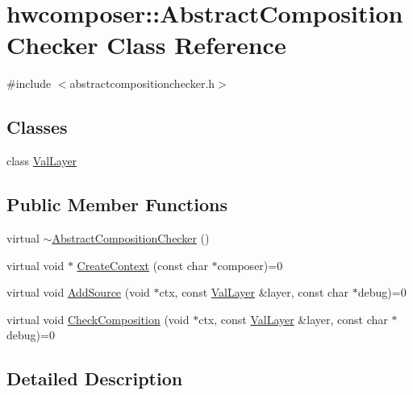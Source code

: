 \hypertarget{classhwcomposer_1_1AbstractCompositionChecker}{}\section{hwcomposer\+:\+:Abstract\+Composition\+Checker Class Reference}
\label{classhwcomposer_1_1AbstractCompositionChecker}


{\ttfamily \#include $<$abstractcompositionchecker.\+h$>$}

\subsection*{Classes}
\begin{DoxyCompactItemize}
\item 
class \mbox{\hyperlink{classhwcomposer_1_1AbstractCompositionChecker_1_1ValLayer}{Val\+Layer}}
\end{DoxyCompactItemize}
\subsection*{Public Member Functions}
\begin{DoxyCompactItemize}
\item 
virtual \mbox{\hyperlink{classhwcomposer_1_1AbstractCompositionChecker_a8673df22430a0a81d5a3ce42fab66f51}{$\sim$\+Abstract\+Composition\+Checker}} ()
\item 
virtual void $\ast$ \mbox{\hyperlink{classhwcomposer_1_1AbstractCompositionChecker_a40367c07e9fb0af09d6637358a32c87d}{Create\+Context}} (const char $\ast$composer)=0
\item 
virtual void \mbox{\hyperlink{classhwcomposer_1_1AbstractCompositionChecker_abac80979c4d1eb158937bee145cda42b}{Add\+Source}} (void $\ast$ctx, const \mbox{\hyperlink{classhwcomposer_1_1AbstractCompositionChecker_1_1ValLayer}{Val\+Layer}} \&layer, const char $\ast$debug)=0
\item 
virtual void \mbox{\hyperlink{classhwcomposer_1_1AbstractCompositionChecker_a684a75b02b7cfd60c62d91d8455b3737}{Check\+Composition}} (void $\ast$ctx, const \mbox{\hyperlink{classhwcomposer_1_1AbstractCompositionChecker_1_1ValLayer}{Val\+Layer}} \&layer, const char $\ast$debug)=0
\end{DoxyCompactItemize}


\subsection{Detailed Description}


